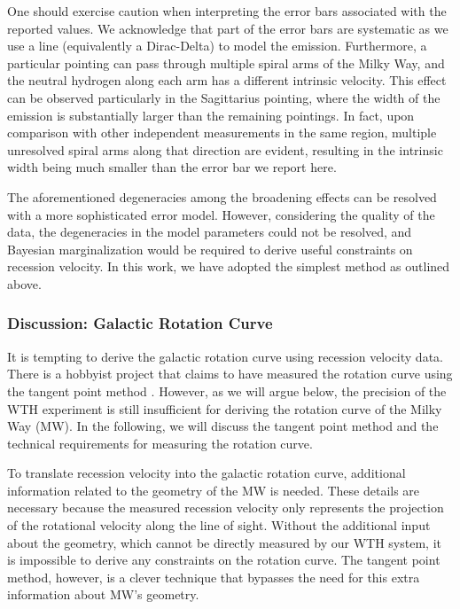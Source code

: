 \documentclass[12pt]{article}
\begin{document}
        One should exercise caution when interpreting the error bars associated with the reported values. We acknowledge that part of the error bars are systematic as we use a line (equivalently a Dirac-Delta) to model the emission. Furthermore, a particular pointing can pass through multiple spiral arms of the Milky Way, and the neutral hydrogen along each arm has a different intrinsic velocity. This effect can be observed particularly in the Sagittarius pointing, where the width of the emission is substantially larger than the remaining pointings. In fact, upon comparison with other independent measurements in the same region, multiple unresolved spiral arms along that direction are evident, resulting in the intrinsic width being much smaller than the error bar we report here.
    
    The aforementioned degeneracies among the broadening effects can be resolved with a more sophisticated error model. However, considering the quality of the data, the degeneracies in the model parameters could not be resolved, and Bayesian marginalization would be required to derive useful constraints on recession velocity. In this work, we have adopted the simplest method as outlined above.

    \subsubsection{Discussion: Galactic Rotation Curve} \label{sect: rotation-curve}
    It is tempting to derive the galactic rotation curve using recession velocity data. There is a hobbyist project that claims to have measured the rotation curve using the tangent point method \cite{physicsOpenLab-project,PhysicsOpenLab-rotation-curve}. However, as we will argue below, the precision of the WTH experiment is still insufficient for deriving the rotation curve of the Milky Way (MW). In the following, we will discuss the tangent point method and the technical requirements for measuring the rotation curve.

    To translate recession velocity into the galactic rotation curve, additional information related to the geometry of the MW is needed. 
    These details are necessary because the measured recession velocity only represents the projection of the rotational velocity along the line of sight. 
    Without the additional input about the geometry, which cannot be directly measured by our WTH system, it is impossible to derive any constraints on the rotation curve. The tangent point method, however, is a clever technique that bypasses the need for this extra information about MW's geometry.
    
\end{document}
